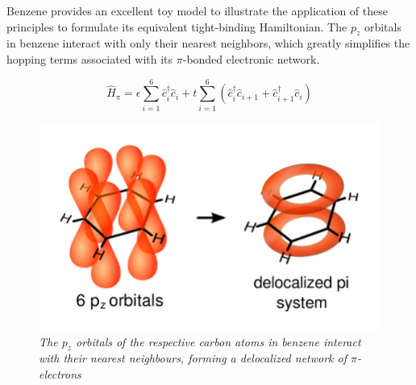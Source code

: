 Benzene provides an excellent toy model to illustrate the application of these principles to formulate its equivalent tight-binding Hamiltonian. The $p_{z}$ orbitals in benzene interact with only their nearest neighbors, which greatly simplifies the hopping terms associated with its $\pi$-bonded electronic network. 

\begin{equation*}
    \hat{H}_{\pi} = \epsilon \sum_{i=1}^{6} \hat{c}_{i}^{\dagger} \hat{c}_{i} + t \sum_{i=1}^{6} (\hat{c}_{i}^{\dagger} \hat{c}_{i+1} + \hat{c}_{i+1}^{\dagger} \hat{c}_{i})
\end{equation*}

\vspace{1cm}

\begin{figure}[h]
\centering
\includegraphics[scale=0.7]{benzene.png}
\caption{\textit{The $p_{z}$ orbitals of the respective carbon atoms in benzene interact with their nearest neighbours, forming a delocalized network of $\pi$-electrons}}\label{benzene}
\end{figure}